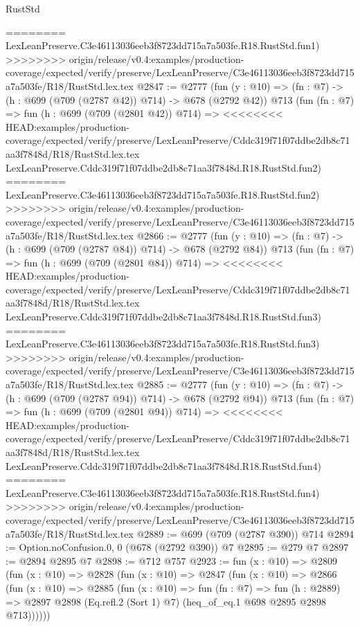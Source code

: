 \begin{lexlean}{RustStd}
\begin{coremodule}
{\begin{coremodule}
{{{{{{{{{========
    LexLeanPreserve.C3e46113036eeb3f8723dd715a7a503fe.R18.RustStd.fun1)
>>>>>>>> origin/release/v0.4:examples/production-coverage/expected/verify/preserve/LexLeanPreserve/C3e46113036eeb3f8723dd715a7a503fe/R18/RustStd.lex.tex
@2847 := @2777
    (fun (y : @10) => (fn : @7) -> (h : @699 (@709 (@2787 @42)) @714) -> @678 (@2792 @42))
    @713
    (fun (fn : @7) =>
    fun (h : @699 (@709 (@2801 @42)) @714) =>
<<<<<<<< HEAD:examples/production-coverage/expected/verify/preserve/LexLeanPreserve/Cddc319f71f07ddbe2db8c71aa3f7848d/R18/RustStd.lex.tex
    LexLeanPreserve.Cddc319f71f07ddbe2db8c71aa3f7848d.R18.RustStd.fun2)
========
    LexLeanPreserve.C3e46113036eeb3f8723dd715a7a503fe.R18.RustStd.fun2)
>>>>>>>> origin/release/v0.4:examples/production-coverage/expected/verify/preserve/LexLeanPreserve/C3e46113036eeb3f8723dd715a7a503fe/R18/RustStd.lex.tex
@2866 := @2777
    (fun (y : @10) => (fn : @7) -> (h : @699 (@709 (@2787 @84)) @714) -> @678 (@2792 @84))
    @713
    (fun (fn : @7) =>
    fun (h : @699 (@709 (@2801 @84)) @714) =>
<<<<<<<< HEAD:examples/production-coverage/expected/verify/preserve/LexLeanPreserve/Cddc319f71f07ddbe2db8c71aa3f7848d/R18/RustStd.lex.tex
    LexLeanPreserve.Cddc319f71f07ddbe2db8c71aa3f7848d.R18.RustStd.fun3)
========
    LexLeanPreserve.C3e46113036eeb3f8723dd715a7a503fe.R18.RustStd.fun3)
>>>>>>>> origin/release/v0.4:examples/production-coverage/expected/verify/preserve/LexLeanPreserve/C3e46113036eeb3f8723dd715a7a503fe/R18/RustStd.lex.tex
@2885 := @2777
    (fun (y : @10) => (fn : @7) -> (h : @699 (@709 (@2787 @94)) @714) -> @678 (@2792 @94))
    @713
    (fun (fn : @7) =>
    fun (h : @699 (@709 (@2801 @94)) @714) =>
<<<<<<<< HEAD:examples/production-coverage/expected/verify/preserve/LexLeanPreserve/Cddc319f71f07ddbe2db8c71aa3f7848d/R18/RustStd.lex.tex
    LexLeanPreserve.Cddc319f71f07ddbe2db8c71aa3f7848d.R18.RustStd.fun4)
========
    LexLeanPreserve.C3e46113036eeb3f8723dd715a7a503fe.R18.RustStd.fun4)
>>>>>>>> origin/release/v0.4:examples/production-coverage/expected/verify/preserve/LexLeanPreserve/C3e46113036eeb3f8723dd715a7a503fe/R18/RustStd.lex.tex
@2889 := @699 (@709 (@2787 @390)) @714
@2894 := Option.noConfusion.{0, 0} (@678 (@2792 @390)) @7
@2895 := @279 @7
@2897 := @2894 @2895 @7
@2898 := @712 @757
@2923 := fun (x : @10) =>
  @2809
    (fun (x : @10) =>
    @2828
      (fun (x : @10) =>
      @2847
        (fun (x : @10) =>
        @2866
          (fun (x : @10) =>
          @2885
            (fun (x : @10) =>
            fun (fn : @7) =>
            fun (h : @2889) =>
            @2897 @2898 (Eq.refl.{2} (Sort 1) @7) (heq_of_eq.{1} @698 @2895 @2898 @713))))))
}}}}}}}}}
\end{coremodule}}
\end{coremodule}
\end{lexlean}
